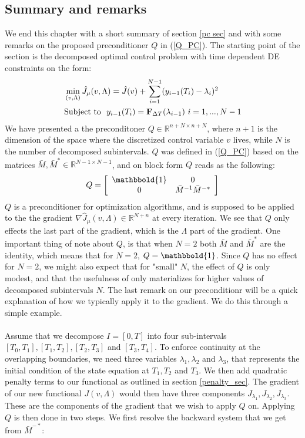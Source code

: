 \subsection{Summary and remarks}
We end this chapter with a short summary of section \ref{pc sec} and with some remarks on the proposed preconditioner $Q$ in (\ref{Q_PC}). The starting point of the section is the decomposed optimal control problem with time dependent DE constraints on the form:
\begin{align}
&\min_{(v,\Lambda)}\hat J_{\mu}(v,\Lambda) =\hat{J}(v)+ \sum_{i=1}^{N-1} (y_{i-1}(T_{i})-\lambda_{i})^2  \\
&\textrm{Subject to } \ y_{i-1}(T_{i}) = \bold F_{\Delta T}(\lambda_{i-1}) \ i=1,...,N-1 
\end{align}
We have presented a the preconditoner $Q\in\mathbb{R}^{n+N\times n+N}$, where $n+1$ is the dimension of the space where the discretized control variable $v$ lives, while $N$ is the number of decomposed subintervals. $Q$ was defined in (\ref{Q_PC}) based on the matrices $\bar M,\bar M^*\in\mathbb{R}^{N-1\times N-1}$, and on block form $Q$ reads as the following:
\begin{align*}
Q = \left[ \begin{array}{cc}
	\mathbbold{1} & 0 \\
	0 &  \bar{M}^{-1}\bar{M}^{-*}\\
	\end{array} \right] 
\end{align*}
$Q$ is a preconditioner for optimization algorithms, and is supposed to be applied to the the gradient $\nabla \hat J_{\mu}(v,\Lambda)\in\mathbb{R}^{N+n}$ at every iteration. We see that $Q$ only effects the last part of the gradient, which is the $\Lambda$ part of the gradient. One important thing of note about $Q$, is that when $N=2$ both $\bar M$ and $\bar M^*$ are the identity, which means that for $N=2$, $Q=\mathbbold{1}$. Since $Q$ has no effect for $N=2$, we might also expect that for "small" $N$, the effect of $Q$ is only modest, and that the usefulness of only materializes for higher values of decomposed subintervals $N$. The last remark on our preconditionr will be a quick explanation of how we typically apply it to the gradient. We do this through a simple example.   
\\
\\
Assume that we decompose $I=[0,T]$ into four sub-intervals $[T_0,T_1], [T_1,T_2], [T_2,T_3]$ and $[T_3,T_4]$. To enforce continuity at the overlapping boundaries, we need three variables $\lambda_1,\lambda_2$ and $\lambda_3$, that represents the initial condition of the state equation at $T_1,T_2$ and $T_3$. We then add quadratic penalty terms to our functional as outlined in section \ref{penalty_sec}. The gradient of our new functional $J(v,\Lambda)$ would then have three components $J_{\lambda_1}, J_{\lambda_2}, J_{\lambda_3}$. These are the components of the gradient that we wish to apply $Q$ on. Applying $Q$ is then done in two steps. We first resolve the backward system that we get from $\bar M^{-*}$:
